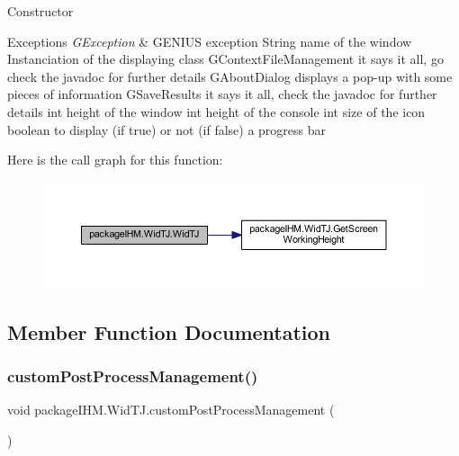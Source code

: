Constructor 
\begin{DoxyExceptions}{Exceptions}
{\em G\+Exception} & G\+E\+N\+I\+US exception String name of the window Instanciation of the displaying class G\+Context\+File\+Management it says it all, go check the javadoc for further details G\+About\+Dialog displays a pop-\/up with some pieces of information G\+Save\+Results it says it all, check the javadoc for further details int height of the window int height of the console int size of the icon boolean to display (if true) or not (if false) a progress bar \\
\hline
\end{DoxyExceptions}
Here is the call graph for this function\+:
\nopagebreak
\begin{figure}[H]
\begin{center}
\leavevmode
\includegraphics[width=350pt]{classpackage_i_h_m_1_1_wid_t_j_a91eaa9ba3a133dee647a5055d255c2d5_cgraph}
\end{center}
\end{figure}


\subsection{Member Function Documentation}
\mbox{\label{classpackage_i_h_m_1_1_wid_t_j_a68ac9fee9a64a7fa20e721ecef5438c5}} 
\subsubsection{\texorpdfstring{custom\+Post\+Process\+Management()}{customPostProcessManagement()}}
{\footnotesize\ttfamily void package\+I\+H\+M.\+Wid\+T\+J.\+custom\+Post\+Process\+Management (\begin{DoxyParamCaption}{ }\end{DoxyParamCaption})\hspace{0.3cm}{\ttfamily [protected]}}


